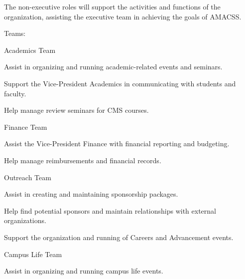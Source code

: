 \documentclass[12pt,a4paper]{article}
\begin{document}
\begin{constitutionlist}
\item The non-executive roles will support the activities and functions of the organization, assisting the executive team in achieving the goals of AMACSS.

\item Teams:

\begin{constitutionlist}
\item Academics Team

\begin{constitutionlist}
\item Assist in organizing and running academic-related events and seminars.

\item Support the Vice-President Academics in communicating with students and faculty.

\item Help manage review seminars for CMS courses.
\end{constitutionlist}

\item Finance Team

\begin{constitutionlist}
\item Assist the Vice-President Finance with financial reporting and budgeting.

\item Help manage reimbursements and financial records.
\end{constitutionlist}

\item Outreach Team

\begin{constitutionlist}
\item Assist in creating and maintaining sponsorship packages.

\item Help find potential sponsors and maintain relationships with external organizations.

\item Support the organization and running of Careers and Advancement events.
\end{constitutionlist}

\item Campus Life Team

\begin{constitutionlist}
\item Assist in organizing and running campus life events.


\end{constitutionlist}
\end{constitutionlist}
\end{constitutionlist}
\end{document}
